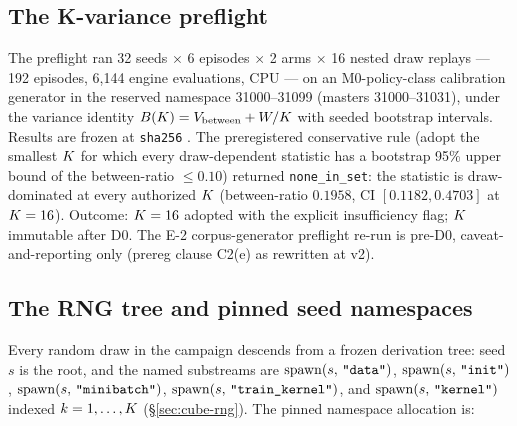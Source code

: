 \subsection{The K-variance preflight}
\label{app:engine-kpreflight}

The preflight ran 32 seeds $\times$ 6 episodes $\times$ 2 arms $\times$ 16
nested draw replays --- 192 episodes, 6{,}144 engine evaluations, CPU ---
on an M0-policy-class calibration generator in the reserved namespace
31000--31099 (masters 31000--31031), under the variance identity
$B(K) = V_{\mathrm{between}} + W/K$ with seeded bootstrap
intervals. Results are frozen at \texttt{sha256} \kpreflighthash{}. The
preregistered conservative rule (adopt the smallest $K$ for which every
draw-dependent statistic has a bootstrap 95\% upper bound of the
between-ratio $\le 0.10$) returned \texttt{none\_in\_set}: the statistic
 is draw-dominated at every authorized
$K$ (between-ratio $0.1958$, CI $[0.1182, 0.4703]$ at $K = 16$).
Outcome: $K = 16$ adopted with the explicit insufficiency flag;
$K$ immutable after D0. The E-2 corpus-generator preflight re-run is
pre-D0, caveat-and-reporting only (prereg clause C2(e) as rewritten at v2).

\subsection{The RNG tree and pinned seed namespaces}
\label{app:engine-seeds}

Every random draw in the campaign descends from a frozen derivation tree:
seed $s$ is the root, and the named substreams are $\operatorname{spawn}(s,\,\texttt{"data"})$,
$\operatorname{spawn}(s,\,\texttt{"init"})$, $\operatorname{spawn}(s,\,\texttt{"minibatch"})$, $\operatorname{spawn}(s,\,\texttt{"train\_kernel"})$, and
$\operatorname{spawn}(s,\,\texttt{"kernel"})$ indexed $k = 1,\dots,K$
(\S\ref{sec:cube-rng}). The pinned namespace allocation is:

